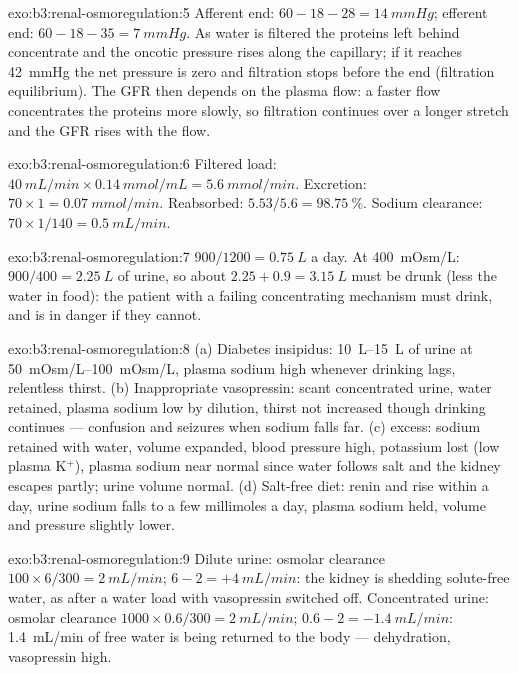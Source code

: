 \begin{solution}{exo:b3:renal-osmoregulation:5}
Afferent end: $60 - 18 - 28 = \qty{14}{mmHg}$; efferent end: $60 - 18 -
35 = \qty{7}{mmHg}$. As water is filtered the proteins left behind
concentrate and the oncotic pressure rises along the capillary; if it
reaches \qty{42}{mmHg} the net pressure is zero and filtration stops
before the end (filtration equilibrium). The GFR then depends on the
plasma flow: a faster flow concentrates the proteins more slowly, so
filtration continues over a longer stretch and the GFR rises with the
flow.
\end{solution}

\begin{solution}{exo:b3:renal-osmoregulation:6}
Filtered load: $\qty{40}{mL/min}\times\qty{0.14}{mmol/mL} =
\qty{5.6}{mmol/min}$. Excretion: $70\times 1 = \qty{0.07}{mmol/min}$.
Reabsorbed: $5.53/5.6 = \qty{98.75}{\%}$. Sodium clearance: $70\times
1/140 = \qty{0.5}{mL/min}$.
\end{solution}

\begin{solution}{exo:b3:renal-osmoregulation:7}
$900/1200 = \qty{0.75}{L}$ a day. At \qty{400}{mOsm/L}: $900/400 =
\qty{2.25}{L}$ of urine, so about $2.25 + 0.9 = \qty{3.15}{L}$ must be
drunk (less the water in food): the patient with a failing
concentrating mechanism must drink, and is in danger if they cannot.
\end{solution}

\begin{solution}{exo:b3:renal-osmoregulation:8}
(a) Diabetes insipidus: \qtyrange{10}{15}{L} of urine at
\qtyrange{50}{100}{mOsm/L}, plasma sodium high whenever drinking lags,
relentless thirst. (b) Inappropriate vasopressin: scant concentrated
urine, water retained, plasma sodium low by dilution, thirst not
increased though drinking continues --- confusion and seizures when
sodium falls far. (c)  excess: sodium retained with water,
volume expanded, blood pressure high, potassium lost (low plasma
K$^{+}$), plasma sodium near normal since water follows salt and the
kidney escapes partly; urine volume normal. (d) Salt-free diet: renin
and  rise within a day, urine sodium falls to a few
millimoles a day, plasma sodium held, volume and pressure slightly
lower.
\end{solution}

\begin{solution}{exo:b3:renal-osmoregulation:9}
Dilute urine: osmolar clearance $100\times 6/300 = \qty{2}{mL/min}$;
 $6 - 2 = +\qty{4}{mL/min}$: the kidney is shedding
solute-free water, as after a water load with vasopressin switched off.
Concentrated urine: osmolar clearance $1000\times 0.6/300 =
\qty{2}{mL/min}$;  $0.6 - 2 = -\qty{1.4}{mL/min}$:
\qty{1.4}{mL/min} of free water is being returned to the body ---
dehydration, vasopressin high.
\end{solution}

